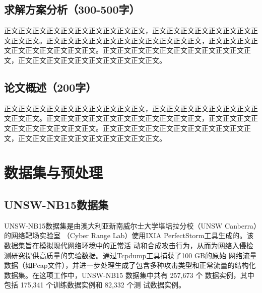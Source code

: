 \documentclass{article}
\begin{document}
\subsection{求解方案分析（300-500字）}
正文正文正文正文正文正文正文正文正文正文，正文正文正文正文正文正文正文正文正文正文。正文正文正文正文正文正文正文正文正文正文正文，正文正文正文正文正文正文正文正文正文正文。正文正文正文正文正文正文正文正文正文正文正文，正文正文正文正文正文正文正文正文正文正文。

\subsection{论文概述（200字）}
正文正文正文正文正文正文正文正文正文正文，正文正文正文正文正文正文正文正文正文正文。正文正文正文正文正文正文正文正文正文正文正文，正文正文正文正文正文正文正文正文正文正文。正文正文正文正文正文正文正文正文正文正文正文，正文正文正文正文正文正文正文正文正文正文。



\section{数据集与预处理}
\subsection{UNSW-NB15数据集}
UNSW-NB15数据集是由澳大利亚新南威尔士大学堪培拉分校（UNSW Canberra）的网络靶场实验室
（Cyber Range Lab）使用IXIA PerfectStorm工具生成的。该数据集旨在模拟现代网络环境中的正常活
动和合成攻击行为，从而为网络入侵检测研究提供高质量的实验数据。通过Tcpdump工具捕获了100 GB的原始
网络流量数据（如Pcap文件），并进一步处理生成了包含多种攻击类型和正常流量的结构化数据集。在这项工作中，UNSW-NB15 
数据集中共有 257,673 个
数据实例，其中包括 175,341 个训练数据实例和 82,332 个测
试数据实例。
\end{document}

